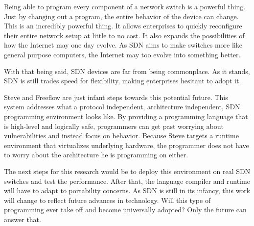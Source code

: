 Being able to program every component of a network switch is a powerful thing. Just by changing out a program, the entire behavior of the device can change. This is an incredibly powerful thing. It allows enterprises to quickly reconfigure their entire network setup at little to no cost. It also expands the possibilities of how the Internet may one day evolve. As SDN aims to make switches more like general purpose computers, the Internet may too evolve into something better.

With that being said, SDN devices are far from being commonplace. As it stands, SDN is still trades speed for flexibility, making enterprises hesitant to adopt it. 

Steve and Freeflow are just infant steps towards this potential future. This system addresses what a protocol independent, architecture independent, SDN programming environment looks like. By providing a programming language that is high-level and logically safe, programmers
can get past worrying about vulnerabilities and instead focus on behavior.
Because Steve targets a runtime environment that virtualizes underlying hardware, the programmer does not have to worry about the architecture he is programming on either.

The next steps for this research would be to deploy this environment on real SDN switches and test the performance. After that, the language compiler and runtime will have to adapt to portability concerns. As SDN is still in its infancy, this work will change to reflect future advances in technology. Will this type of programming ever take off and become universally adopted? Only the future can answer that.
